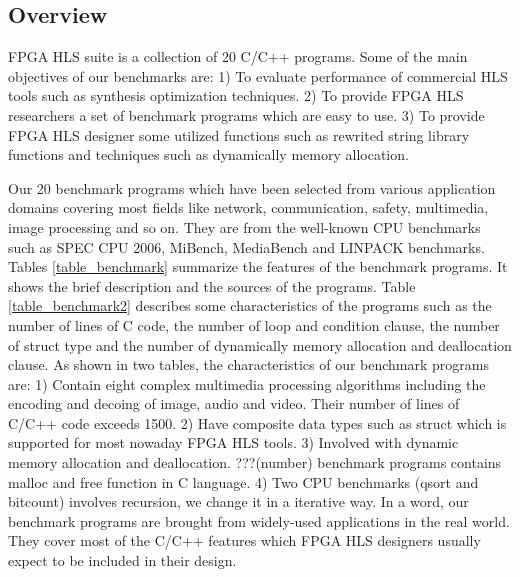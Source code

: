 \documentclass[conference]{IEEEtran}
\begin{document}
\subsection{Overview}
FPGA HLS suite is a collection of 20 C/C++ programs. Some of the main objectives of our benchmarks are:
1) To evaluate performance of commercial HLS tools such as synthesis optimization techniques.
2) To provide FPGA HLS researchers a set of benchmark programs which are easy to use.
3) To provide FPGA HLS designer some utilized functions such as rewrited string library functions and techniques such as dynamically memory allocation.

Our 20 benchmark programs which have been selected from various application domains covering most fields like network, communication, safety, multimedia, image processing and so on. They are from the well-known CPU benchmarks such as SPEC CPU 2006, MiBench, MediaBench and LINPACK benchmarks. Tables \ref{table_benchmark} summarize the features of the benchmark programs. It shows the
brief description and the sources of the programs. Table \ref{table_benchmark2} describes some characteristics of the programs such as the number of lines of C code, the number of loop and condition clause, the number of struct type and the number of dynamically memory allocation and deallocation clause. As shown in two tables, the characteristics of our benchmark programs are:
1) Contain eight complex multimedia processing algorithms including the encoding and decoing of image, audio and video. Their number of lines of C/C++ code exceeds 1500.
2) Have composite data types such as struct which is supported for most nowaday FPGA HLS tools.
3) Involved with dynamic memory allocation and deallocation. ???(number) benchmark programs contains malloc and free function in C language.
4) Two CPU benchmarks (qsort and bitcount) involves recursion, we change it in a iterative way.
In a word, our benchmark programs are brought from widely-used applications in the real world. They cover most of the C/C++ features which FPGA HLS designers usually expect to be included in their design.
\end{document}
